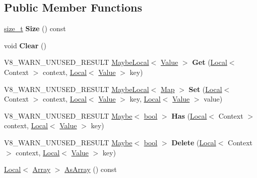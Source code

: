 \subsection*{Public Member Functions}
\begin{DoxyCompactItemize}
\item 
\mbox{\label{classv8_1_1Map_a62cb76161d9a4a62a14e32b2f3f5b490}} 
\mbox{\hyperlink{classsize__t}{size\+\_\+t}} {\bfseries Size} () const
\item 
\mbox{\label{classv8_1_1Map_a06ee0d566d206058a7fe22c140000be4}} 
void {\bfseries Clear} ()
\item 
\mbox{\label{classv8_1_1Map_a79c6e87f634c22b17a56252be6f3e871}} 
V8\+\_\+\+W\+A\+R\+N\+\_\+\+U\+N\+U\+S\+E\+D\+\_\+\+R\+E\+S\+U\+LT \mbox{\hyperlink{classv8_1_1MaybeLocal}{Maybe\+Local}}$<$ \mbox{\hyperlink{classv8_1_1Value}{Value}} $>$ {\bfseries Get} (\mbox{\hyperlink{classv8_1_1Local}{Local}}$<$ Context $>$ context, \mbox{\hyperlink{classv8_1_1Local}{Local}}$<$ \mbox{\hyperlink{classv8_1_1Value}{Value}} $>$ key)
\item 
\mbox{\label{classv8_1_1Map_aac0d846409ad68783046b318fb50f764}} 
V8\+\_\+\+W\+A\+R\+N\+\_\+\+U\+N\+U\+S\+E\+D\+\_\+\+R\+E\+S\+U\+LT \mbox{\hyperlink{classv8_1_1MaybeLocal}{Maybe\+Local}}$<$ \mbox{\hyperlink{classv8_1_1Map}{Map}} $>$ {\bfseries Set} (\mbox{\hyperlink{classv8_1_1Local}{Local}}$<$ Context $>$ context, \mbox{\hyperlink{classv8_1_1Local}{Local}}$<$ \mbox{\hyperlink{classv8_1_1Value}{Value}} $>$ key, \mbox{\hyperlink{classv8_1_1Local}{Local}}$<$ \mbox{\hyperlink{classv8_1_1Value}{Value}} $>$ value)
\item 
\mbox{\label{classv8_1_1Map_a7a4cbc33fa074d1d2b0c04a6007622c6}} 
V8\+\_\+\+W\+A\+R\+N\+\_\+\+U\+N\+U\+S\+E\+D\+\_\+\+R\+E\+S\+U\+LT \mbox{\hyperlink{classv8_1_1Maybe}{Maybe}}$<$ \mbox{\hyperlink{classbool}{bool}} $>$ {\bfseries Has} (\mbox{\hyperlink{classv8_1_1Local}{Local}}$<$ Context $>$ context, \mbox{\hyperlink{classv8_1_1Local}{Local}}$<$ \mbox{\hyperlink{classv8_1_1Value}{Value}} $>$ key)
\item 
\mbox{\label{classv8_1_1Map_a59d3042fd33d8fb616489a6dd8d8c53c}} 
V8\+\_\+\+W\+A\+R\+N\+\_\+\+U\+N\+U\+S\+E\+D\+\_\+\+R\+E\+S\+U\+LT \mbox{\hyperlink{classv8_1_1Maybe}{Maybe}}$<$ \mbox{\hyperlink{classbool}{bool}} $>$ {\bfseries Delete} (\mbox{\hyperlink{classv8_1_1Local}{Local}}$<$ Context $>$ context, \mbox{\hyperlink{classv8_1_1Local}{Local}}$<$ \mbox{\hyperlink{classv8_1_1Value}{Value}} $>$ key)
\item 
\mbox{\hyperlink{classv8_1_1Local}{Local}}$<$ \mbox{\hyperlink{classv8_1_1Array}{Array}} $>$ \mbox{\hyperlink{classv8_1_1Map_a0d3173740c212cca579fc19249eb5c90}{As\+Array}} () const
\end{DoxyCompactItemize}
